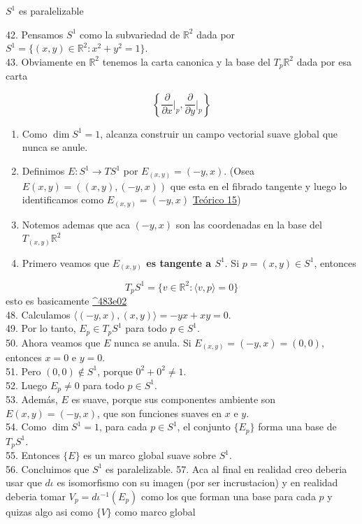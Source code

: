 \begin{bookexample}{}
$S^{1}$ es paralelizable

\end{bookexample}
\begin{bookproof}{}
42. Pensamos $S^1$ como la subvariedad de $\mathbb R^2$ dada por $S^1=\{(x,y)\in\mathbb R^2:x^2+y^2=1\}$.\\
43. Obviamente en $\mathbb{R}^{2}$ tenemos la carta canonica y la base del $T_{p}\mathbb{R}^{2}$ dada por esa carta

\[
\left\{ \frac{\partial}{\partial x}\bigg|_{p},\frac{\partial}{\partial y}\bigg|_{p} \right\}
\]
\begin{enumerate}[start=44]
\item Como $\dim S^1=1$, alcanza construir un campo vectorial suave global que nunca se anule.
\item Definimos $E:S^1\to TS^1$ por $E_{(x,y)}=(-y,x)$. (Osea $E(x,y)=((x,y),(-y,x))$ que esta en el fibrado tangente y luego lo identificamos como $E_{(x,y)}=(-y,x)$ \hyperref[blk:4e6c26]{Teórico 15})
\item Notemos ademas que aca $(-y,x)$ son las coordenadas en la base del $T_{(x,y)}\mathbb{R}^{2}$
\item Primero veamos que \textbf{$E_{(x,y)}$ es tangente a $S^1$}. Si $p=(x,y)\in S^1$, entonces
\end{enumerate}
\[
T_pS^1=\{v\in\mathbb R^2:\langle v,p\rangle=0\}
\]
esto es basicamente \hyperref[blk:483e02]{\textasciicircum{}483e02}\\
48. Calculamos $\langle (-y,x),(x,y)\rangle=-yx+xy=0$.\\
49. Por lo tanto, $E_p\in T_pS^1$ para todo $p\in S^1$.\\
50. Ahora veamos que $E$ nunca se anula. Si $E_{(x,y)}=(-y,x)=(0,0)$, entonces $x=0$ e $y=0$.\\
51. Pero $(0,0)\notin S^1$, porque $0^2+0^2\neq 1$.\\
52. Luego $E_p\neq 0$ para todo $p\in S^1$.\\
53. Además, $E$ es suave, porque sus componentes ambiente son $E(x,y)=(-y,x)$, que son funciones suaves en $x$ e $y$.\\
54. Como $\dim S^1=1$, para cada $p\in S^1$, el conjunto $\{E_p\}$ forma una base de $T_pS^1$.\\
55. Entonces $\{E\}$ es un marco global suave sobre $S^1$.\\
56. Concluimos que $S^1$ es paralelizable. 57. Aca al final en realidad creo deberia usar que $d\iota$ es isomorfismo con su imagen (por ser incrustacion) y en realidad deberia tomar $V_{p}=d\iota ^{-1}(E_{p})$ como los que forman una base para cada $p$ y quizas algo asi como $\{ V \}$ como marco global

\bookqed
\end{bookproof}
